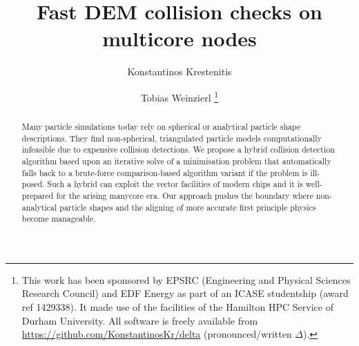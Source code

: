 \documentclass{llncs}
\title{Fast DEM collision checks on multicore nodes}
\author{
  Konstantinos Krestenitis
  \and
  Tobias Weinzierl
\thanks{
This work has been sponsored by EPSRC (Engineering and Physical Sciences
Research Council) and EDF Energy as part of an ICASE studentship  (award ref 1429338). 
It made use of the facilities of the Hamilton HPC Service of Durham
University.
All software is freely available from \url{https://github.com/KonstantinosKr/delta}
(pronounced/written $\Delta $).
}
}
\institute{
  School of Engineering and Computing Sciences\\
  Durham University\\
  Great Britain \\
  \email{\{konstantinos.krestenitis,tobias.weinzierl\}@durham.ac.uk}
}
\begin{document}
\maketitle

\begin{abstract}
Many particle simulations today rely on spherical or analytical particle shape
descriptions.
They find non-spherical, triangulated particle models computationally
infeasible due to expensive collision detections.
We propose a hybrid collision detection algorithm based upon an iterative
solve of a minimisation problem that automatically falls back to a brute-force
comparison-based algorithm variant if the problem is ill-posed.
Such a hybrid can exploit the vector facilities of modern chips and it is
well-prepared for the arising manycore era.
Our approach pushes the boundary where non-analytical particle shapes
and the aligning of more accurate first principle physics become manageable.
\end{abstract}
 






 
\end{document}

